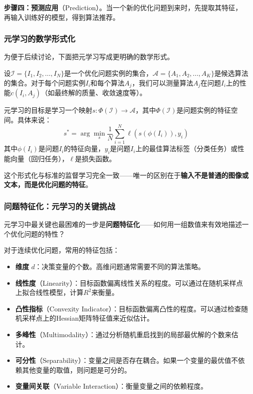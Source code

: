 \documentclass[lang=cn,zihao=-4,a4paper,fontset=windows]{beautybook}
\begin{document}
\textbf{步骤四：预测应用}（Prediction）。当一个新的优化问题到来时，先提取其特征，再输入训练好的模型，得到算法推荐。

\subsubsection{元学习的数学形式化}

为便于后续讨论，下面把元学习写成更明确的数学形式。

设$\mathcal{I} = \{I_1, I_2, \dots, I_N\}$是一个优化问题实例的集合，$\mathcal{A} = \{A_1, A_2, \dots, A_K\}$是候选算法的集合。对于每个问题实例$I_i$和每个算法$A_j$，我们可以测量算法$A_j$在问题$I_i$上的性能$c(I_i, A_j)$（如最终解的质量、收敛速度等）。

元学习的目标是学习一个映射$s: \Phi(\mathcal{I}) \to \mathcal{A}$，其中$\Phi(\mathcal{I})$是问题实例的特征空间。具体来说：
\[
s^* = \arg\min_{s} \frac{1}{N} \sum_{i=1}^{N} \ell(s(\phi(I_i)), y_i)
\]
其中$\phi(I_i)$是问题$I_i$的特征向量，$y_i$是问题$I_i$上的最佳算法标签（分类任务）或性能向量（回归任务），$\ell$是损失函数。

这个形式化与标准的监督学习完全一致——唯一的区别在于\textbf{输入不是普通的图像或文本，而是优化问题的特征}。

\subsubsection{问题特征化：元学习的关键挑战}

元学习中最关键也最困难的一步是\textbf{问题特征化}——如何用一组数值来有效地描述一个优化问题的特性？

对于连续优化问题，常用的特征包括：
\begin{itemize}
    \item \textbf{维度} $d$：决策变量的个数。高维问题通常需要不同的算法策略。
    \item \textbf{线性度}（Linearity）：目标函数偏离线性关系的程度。可以通过在随机采样点上拟合线性模型，计算$R^2$来衡量。
    \item \textbf{凸性指标}（Convexity Indicator）：目标函数偏离凸性的程度。可以通过检查随机采样点上的Hessian矩阵特征值来近似估计。
    \item \textbf{多峰性}（Multimodality）：通过分析随机重启找到的局部最优解的个数来估计。
    \item \textbf{可分性}（Separability）：变量之间是否存在耦合。如果一个变量的最优值不依赖其他变量的取值，则问题是可分的。
    \item \textbf{变量间关联}（Variable Interaction）：衡量变量之间的依赖程度。
\end{itemize}
\end{document}
